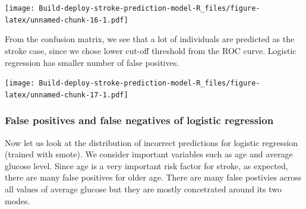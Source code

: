 \documentclass[
]{article}
\newenvironment{Shaded}{\begin{snugshade}}{\end{snugshade}}
\newcommand{\AttributeTok}[1]{\textcolor[rgb]{0.13,0.29,0.53}{#1}}
\newcommand{\DecValTok}[1]{\textcolor[rgb]{0.00,0.00,0.81}{#1}}
\newcommand{\FunctionTok}[1]{\textcolor[rgb]{0.13,0.29,0.53}{\textbf{#1}}}
\newcommand{\NormalTok}[1]{#1}
\newcommand{\OtherTok}[1]{\textcolor[rgb]{0.56,0.35,0.01}{#1}}
\newcommand{\SpecialCharTok}[1]{\textcolor[rgb]{0.81,0.36,0.00}{\textbf{#1}}}
\newcommand{\StringTok}[1]{\textcolor[rgb]{0.31,0.60,0.02}{#1}}
\begin{document}
\texttt{[image: Build-deploy-stroke-prediction-model-R\_files/figure-latex/unnamed-chunk-16-1.pdf]}

From the confusion matrix, we see that a lot of individuals are
predicted as the stroke case, since we chose lower cut-off threshold
from the ROC curve. Logistic regression has smaller number of false
positives.

\begin{Shaded}
\end{Shaded}

\texttt{[image: Build-deploy-stroke-prediction-model-R\_files/figure-latex/unnamed-chunk-17-1.pdf]}

\subsubsection{\texorpdfstring{\textbf{False positives and false
negatives of logistic
regression}}{False positives and false negatives of logistic regression}}\label{false-positives-and-false-negatives-of-logistic-regression}

Now let us look at the distribution of incorrect predictions for
logistic regression (trained with smote). We consider important
variables such as age and average glucose level. Since age is a very
important risk factor for stroke, as expected, there are many false
positives for older age. There are many false postivies across all
values of average glucose but they are mostly concetrated around its two
modes.
\end{document}
